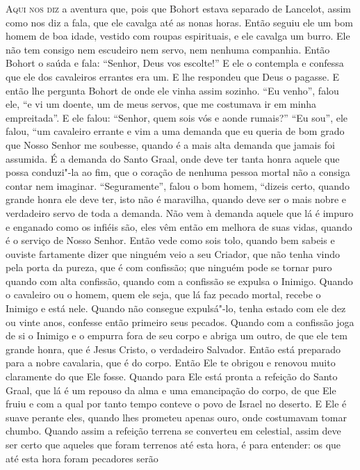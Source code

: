 \textsc{Aqui nos diz} a aventura que, pois que Bohort estava separado de Lancelot, assim
como nos diz a fala, que ele cavalga até as nonas horas. Então seguiu
ele um bom homem de boa idade, vestido com roupas espirituais, e ele cavalga um
burro. Ele não tem consigo nem escudeiro nem servo, nem nenhuma companhia.
Então Bohort o saúda e fala: “Senhor, Deus vos escolte!” E ele o contempla e
confessa que ele dos cavaleiros errantes era um. E lhe respondeu que Deus o
pagasse. E então lhe pergunta Bohort de onde ele vinha assim sozinho. “Eu
venho”, falou ele, “e vi um doente, um de meus servos, que me costumava ir em
minha empreitada”. E ele falou: “Senhor, quem sois vós e aonde rumais?” “Eu
sou”, ele falou, “um cavaleiro errante e vim a uma demanda que eu queria de bom
grado que Nosso Senhor me soubesse, quando é a mais alta demanda que jamais foi
assumida. É a demanda do Santo Graal, onde deve ter tanta honra aquele que
possa conduzi"-la ao fim, que o coração de nenhuma pessoa mortal não a consiga
contar nem imaginar. “Seguramente”, falou o bom homem, “dizeis certo, quando
grande honra ele deve ter, isto não é maravilha, quando deve ser o mais nobre e
verdadeiro servo de toda a demanda. Não vem à demanda aquele que lá é
impuro e enganado como os infiéis são, eles vêm então em melhora de suas vidas,
quando é o serviço de Nosso Senhor. Então vede como sois tolo, quando bem
sabeis e ouviste fartamente dizer que ninguém veio a seu Criador, que não tenha
vindo pela porta da pureza, que é com confissão; que ninguém pode se tornar
puro quando com alta confissão, quando com a confissão se expulsa o Inimigo.
Quando o cavaleiro ou o homem, quem ele seja, que lá faz pecado mortal, recebe
o Inimigo e está nele. Quando não consegue expulsá"-lo, tenha estado com ele dez
ou vinte anos, confesse então primeiro seus pecados. Quando com a confissão
joga de si o Inimigo e o empurra fora de seu corpo e abriga um outro, de que
ele tem grande honra, que é Jesus Cristo, o verdadeiro Salvador. Então está
preparado para a nobre cavalaria, que é do corpo. Então Ele te
obrigou e renovou muito claramente do que Ele fosse. Quando para Ele está
pronta a refeição do Santo Graal, que lá é um repouso da alma e uma emancipação
do corpo, de que Ele fruiu e com a qual por tanto tempo conteve o povo de
Israel no deserto. E Ele é suave perante eles, quando lhes prometeu apenas
ouro, onde costumavam tomar chumbo. Quando assim a refeição terrena se
converteu em celestial, assim deve ser certo que aqueles que foram terrenos até
esta hora, é para entender: os que até esta hora foram pecadores serão
